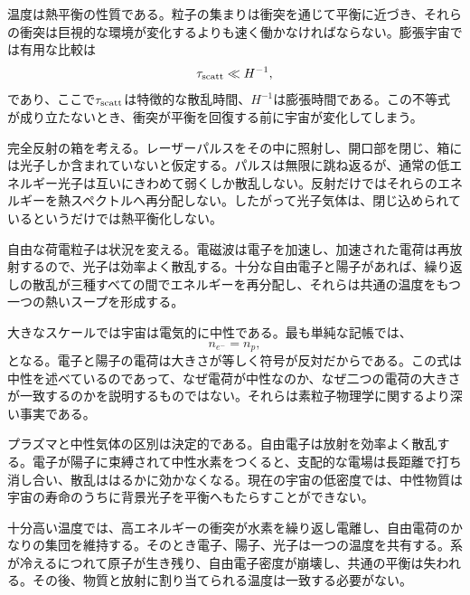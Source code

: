 温度は熱平衡の性質である。粒子の集まりは衝突を通じて平衡に近づき、それらの衝突は巨視的な環境が変化するよりも速く働かなければならない。膨張宇宙では有用な比較は
\begin{equation}
\tau_{\rm scatt}\ll H^{-1},
\label{eq:c07-equilibrium-condition}
\end{equation}
であり、ここで\(\tau_{\rm scatt}\)は特徴的な散乱時間、\(H^{-1}\)は膨張時間である。この不等式が成り立たないとき、衝突が平衡を回復する前に宇宙が変化してしまう。

完全反射の箱を考える。レーザーパルスをその中に照射し、開口部を閉じ、箱には光子しか含まれていないと仮定する。パルスは無限に跳ね返るが、通常の低エネルギー光子は互いにきわめて弱くしか散乱しない。反射だけではそれらのエネルギーを熱スペクトルへ再分配しない。したがって光子気体は、閉じ込められているというだけでは熱平衡化しない。

自由な荷電粒子は状況を変える。電磁波は電子を加速し、加速された電荷は再放射するので、光子は効率よく散乱する。十分な自由電子と陽子があれば、繰り返しの散乱が三種すべての間でエネルギーを再分配し、それらは共通の温度をもつ一つの熱いスープを形成する。

大きなスケールでは宇宙は電気的に中性である。最も単純な記帳では、
\begin{equation}
n_{e^-}=n_p,
\label{eq:c07-neutrality}
\end{equation}
となる。電子と陽子の電荷は大きさが等しく符号が反対だからである。この式は中性を述べているのであって、なぜ電荷が中性なのか、なぜ二つの電荷の大きさが一致するのかを説明するものではない。それらは素粒子物理学に関するより深い事実である。

プラズマと中性気体の区別は決定的である。自由電子は放射を効率よく散乱する。電子が陽子に束縛されて中性水素をつくると、支配的な電場は長距離で打ち消し合い、散乱ははるかに効かなくなる。現在の宇宙の低密度では、中性物質は宇宙の寿命のうちに背景光子を平衡へもたらすことができない。

十分高い温度では、高エネルギーの衝突が水素を繰り返し電離し、自由電荷のかなりの集団を維持する。そのとき電子、陽子、光子は一つの温度を共有する。系が冷えるにつれて原子が生き残り、自由電子密度が崩壊し、共通の平衡は失われる。その後、物質と放射に割り当てられる温度は一致する必要がない。

\begin{classroomqa}
\end{classroomqa}

